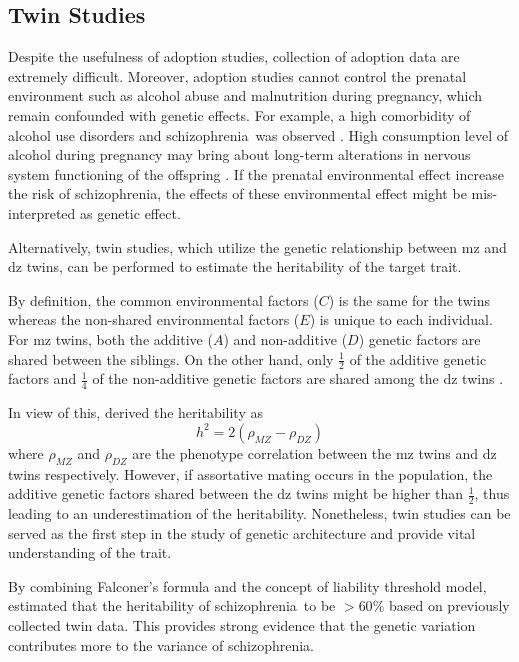 \documentclass[12pt]{scrbook}
\newcommand*{\scz}{schizophrenia}
\begin{document}
\subsection{Twin Studies}
Despite the usefulness of adoption studies, collection of adoption data are extremely difficult. 
Moreover, adoption studies cannot control the prenatal environment such as alcohol abuse and malnutrition during pregnancy, which remain confounded with genetic effects.
For example, a high comorbidity of alcohol use disorders and \scz\ was observed \citep{boyd1984,drake1990}. 
High consumption level of alcohol during pregnancy may bring about long-term alterations in nervous system functioning of the offspring \citep{garrett2014brain}.
If the prenatal environmental effect increase the risk of \scz, the effects of these environmental effect might be mis-interpreted as genetic effect.

Alternatively, twin studies, which utilize the genetic relationship between \gls{mz} and \gls{dz} twins, can be performed to estimate the heritability of the target trait.

By definition, the common environmental factors ($C$) is the same for the twins whereas the non-shared environmental factors ($E$) is unique to each individual.
For \gls{mz} twins, both the additive ($A$) and non-additive ($D$) genetic factors are shared between the siblings. 
On the other hand, only $\frac{1}{2}$ of the additive genetic factors and $\frac{1}{4}$ of the non-additive genetic factors are shared among the \gls{dz} twins \citep{rijsdijk2002analytic}.

In view of this, \citet{falconer1996introduction} derived the heritability as
\begin{equation}
h^2 = 2(\rho_{MZ}-\rho_{DZ})
\end{equation}
where $\rho_{MZ}$ and $\rho_{DZ}$ are the phenotype correlation between the \gls{mz} twins and \gls{dz} twins respectively.
However, if assortative mating occurs in the population, the additive genetic factors shared between the \gls{dz} twins might be higher than $\frac{1}{2}$, thus leading to an underestimation of the heritability.
Nonetheless, twin studies can be served as the first step in the study of genetic architecture and provide vital understanding of the trait.

By combining Falconer's formula and the concept of liability threshold model, \citet{Gottesman1967} estimated that the heritability of \scz\ to be $>60\%$ based on previously collected twin data.
This provides strong evidence that the genetic variation contributes more to the variance of \scz.
\end{document}
